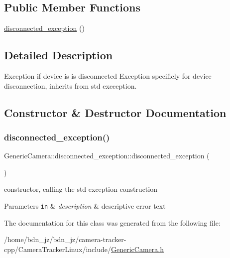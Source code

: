 \subsection*{Public Member Functions}
\begin{DoxyCompactItemize}
\item 
\hyperlink{class_generic_camera_1_1disconnected__exception_ac3e9d17d6848faa8bf458c19ebe21812}{disconnected\+\_\+exception} ()
\end{DoxyCompactItemize}


\subsection{Detailed Description}
Exception if device is is disconnected Exception specificly for device disconnection, inherits from std exeception. 

\subsection{Constructor \& Destructor Documentation}
\mbox{\label{class_generic_camera_1_1disconnected__exception_ac3e9d17d6848faa8bf458c19ebe21812}} 
\subsubsection{\texorpdfstring{disconnected\+\_\+exception()}{disconnected\_exception()}}
{\footnotesize\ttfamily Generic\+Camera\+::disconnected\+\_\+exception\+::disconnected\+\_\+exception (\begin{DoxyParamCaption}{ }\end{DoxyParamCaption})\hspace{0.3cm}{\ttfamily [inline]}}

constructor, calling the std exception construction 
\begin{DoxyParams}[1]{Parameters}
\mbox{\tt in}  & {\em description} & descriptive error text \\
\hline
\end{DoxyParams}


The documentation for this class was generated from the following file\+:\begin{DoxyCompactItemize}
\item 
/home/bdn\+\_\+jz/bdn\+\_\+jz/camera-\/tracker-\/cpp/\+Camera\+Tracker\+Linux/include/\hyperlink{_generic_camera_8h}{Generic\+Camera.\+h}\end{DoxyCompactItemize}
